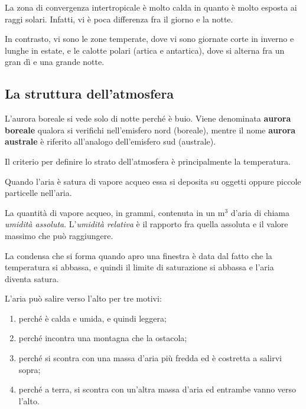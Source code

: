 \documentclass[a4paper]{article}
\begin{document}
La zona di convergenza intertropicale è molto calda in quanto è molto esposta ai raggi solari.
Infatti, vi è poca differenza fra il giorno e la notte.

In contrasto, vi sono le zone temperate, dove vi sono giornate corte in inverno e lunghe
in estate, e le calotte polari (artica e antartica), dove si alterna fra un gran dì e una grande notte.

\subsection{La struttura dell'atmosfera} %



L'aurora boreale si vede solo di notte perché è buio.
Viene denominata \textbf{aurora boreale} qualora si verifichi nell'emisfero nord (boreale),
mentre il nome \textbf{aurora australe} è riferito all'analogo dell'emisfero sud (australe). 

Il criterio per definire lo strato dell'atmosfera è principalmente la temperatura.


Quando l'aria è satura di vapore acqueo essa si deposita su oggetti oppure piccole particelle nell'aria.

La quantità di vapore acqueo, in grammi, contenuta in un m\({}^3\) d'aria di chiama \textit{umidità assoluta}.
L'\textit{umidità relativa} è il rapporto fra quella assoluta e il valore massimo che può raggiungere.

La condensa che si forma quando apro una finestra è data dal fatto che la temperatura si abbassa, e quindi
il limite di saturazione si abbassa e l'aria diventa satura.

L'aria può salire verso l'alto per tre motivi:
\begin{enumerate}
    \item perché è calda e umida, e quindi leggera;
    \item perché incontra una montagna che la ostacola;
    \item perché si scontra con una massa d'aria più fredda ed è costretta a salirvi sopra;
    \item perché a terra, si scontra con un'altra massa d'aria ed entrambe vanno verso l'alto.
\end{enumerate}
\end{document}
